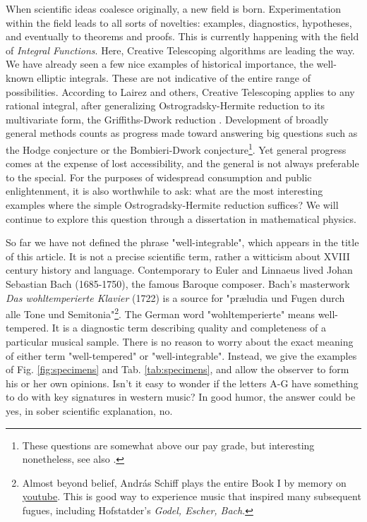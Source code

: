 \documentclass[nofootinbib,preprint]{revtex4-1}
\begin{document}
When scientific ideas coalesce originally, a new field is born. Experimentation within 
the field leads to all sorts of novelties: examples, diagnostics, 
hypotheses, and eventually to theorems and proofs. This is currently happening with the field 
of \textit{Integral Functions}. Here, Creative Telescoping algorithms are leading the way. 
We have already seen a few nice examples of historical importance, the well-known elliptic 
integrals. These are not indicative of the entire range of possibilities. According to Lairez 
and others, Creative Telescoping applies to any rational integral, after generalizing 
Ostrogradsky-Hermite reduction to its multivariate form, the Griffiths-Dwork reduction
\cite{LAIREZ2016}. Development of broadly general methods counts as progress made toward answering 
big questions such as the Hodge conjecture or the Bombieri-Dwork conjecture\footnote{These
questions are somewhat above our pay grade, but interesting nonetheless, see also \cite{TOTARO2007}.}.
Yet general progress comes at the expense of lost accessibility, and the general is not 
always preferable to the special. For the purposes of widespread consumption and public enlightenment, 
it is also worthwhile to ask: what are the most interesting examples where the simple 
Ostrogradsky-Hermite reduction suffices? We will continue to explore this question through
 a dissertation in mathematical physics.

So far we have not defined the phrase "well-integrable", which appears in the title
of this article. It is not a precise scientific term, rather a witticism about XVIII 
century history and language. Contemporary to Euler and Linnaeus lived Johan Sebastian 
Bach (1685-1750), the famous Baroque composer. Bach's masterwork \textit{Das wohltemperierte 
Klavier} (1722) is a source for "pr\ae ludia und Fugen durch alle Tone und Semitonia"\footnote{Almost 
beyond belief, Andr\'{a}s Schiff plays the entire Book I by memory on 
\href{https://www.youtube.com/watch?v=Ugc5FZsycAw}{youtube}. This is good way
to experience music that inspired many subsequent fugues, including Hofstatder's  \textit{Godel, Escher, Bach}.}. 
The German word "wohltemperierte" means well-tempered. It is a diagnostic term describing 
quality and completeness of a particular musical sample. There is no reason to worry about
the exact meaning of either term "well-tempered" or "well-integrable". 
Instead, we give the examples of Fig. \ref{fig:specimens} and Tab. \ref{tab:specimens}, 
and allow the observer to form his or her own opinions. Isn't it easy to wonder if the 
letters A-G have something to do with key signatures in western music? In good humor, the
answer could be yes, in sober scientific explanation, no. 
\end{document}
